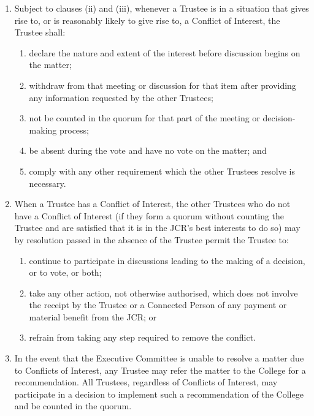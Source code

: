 \documentclass[11pt,a4paper, oneside]{memoir}
\begin{document}
	\begin{enumerate}
		\item Subject to clauses (ii) and (iii), whenever a Trustee is in a situation that gives rise to, or is reasonably likely to give rise to, a Conflict of Interest, the Trustee shall:
		\begin{enumerate}
			\item declare the nature and extent of the interest before discussion begins on the matter;
			\item withdraw from that meeting or discussion for that item after providing any information requested by the other Trustees;
			\item not be counted in the quorum for that part of the meeting or decision-making process;
			\item be absent during the vote and have no vote on the matter; and
			\item comply with any other requirement which the other Trustees resolve is necessary.
		\end{enumerate}
		\item When a Trustee has a Conflict of Interest, the other Trustees who do not have a Conflict of Interest (if they form a quorum without counting the Trustee and are satisfied that it is in the JCR's best interests to do so) may by resolution passed in the absence of the Trustee permit the Trustee to:
		\begin{enumerate}
			\item continue to participate in discussions leading to the making of a decision, or to vote, or both;
			\item take any other action, not otherwise authorised, which does not involve the receipt by the Trustee or a Connected Person of any payment or material benefit from the JCR; or
			\item refrain from taking any step required to remove the conflict.
		\end{enumerate}
		\item In the event that the Executive Committee is unable to resolve a matter due to Conflicts of Interest, any Trustee may refer the matter to the College for a recommendation.
		All Trustees, regardless of Conflicts of Interest, may participate in a decision to implement such a recommendation of the College and be counted in the quorum.
	\end{enumerate}
\end{document}
